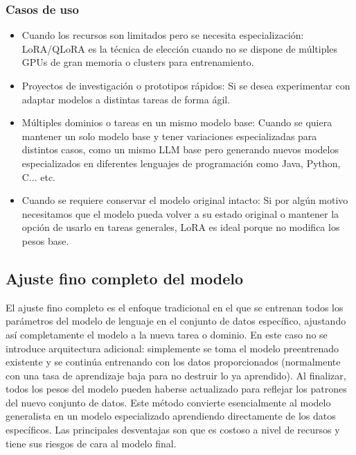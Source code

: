 \subsubsection{Casos de uso}

\begin{itemize}
    \item Cuando los recursos son limitados pero se necesita especialización: LoRA/QLoRA es la técnica de elección cuando no se dispone de múltiples GPUs de gran memoria o clusters para entrenamiento.

    \item Proyectos de investigación o prototipos rápidos: Si se desea experimentar con adaptar modelos a distintas tareas de forma ágil.

    \item Múltiples dominios o tareas en un mismo modelo base: Cuando se quiera mantener un solo modelo base y tener variaciones especializadas para distintos casos, como un mismo LLM base pero generando nuevos modelos especializados en diferentes lenguajes de programación como Java, Python, C... etc.

    \item Cuando se requiere conservar el modelo original intacto: Si por algún motivo necesitamos que el modelo pueda volver a su estado original o mantener la opción de usarlo en tareas generales, LoRA es ideal porque no modifica los pesos base.
\end{itemize}

\subsection{Ajuste fino completo del modelo}

El ajuste fino completo es el enfoque tradicional en el que se entrenan todos los parámetros del modelo de lenguaje en el conjunto de datos específico, ajustando así completamente el modelo a la nueva tarea o dominio. En este caso no se introduce arquitectura adicional: simplemente se toma el modelo preentrenado existente y se continúa entrenando con los datos proporcionados (normalmente con una tasa de aprendizaje baja para no destruir lo ya aprendido). Al finalizar, todos los pesos del modelo pueden haberse actualizado para reflejar los patrones del nuevo conjunto de datos. Este método convierte esencialmente al modelo generalista en un modelo especializado aprendiendo directamente de los datos específicos. Las principales desventajas son que es costoso a nivel de recursos y tiene sus riesgos de cara al modelo final.

